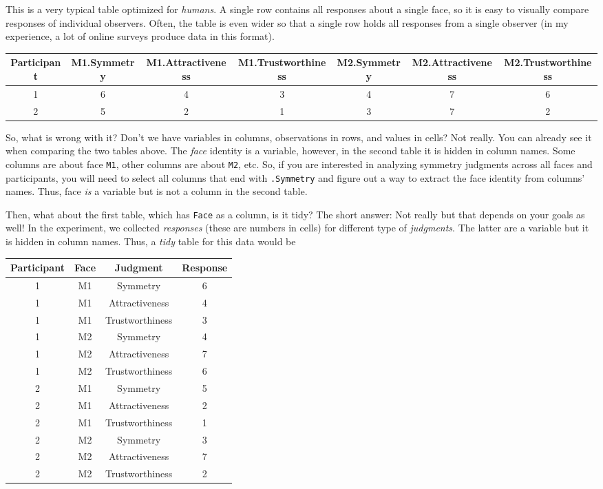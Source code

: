 \documentclass[
]{book}
\begin{document}
This is a very typical table optimized for \emph{humans}. A single row contains all responses about a single face, so it is easy to visually compare responses of individual observers. Often, the table is even wider so that a single row holds all responses from a single observer (in my experience, a lot of online surveys produce data in this format).

\begin{tabular}{c|c|c|c|c|c|c}
\hline
Participant & M1.Symmetry & M1.Attractiveness & M1.Trustworthiness & M2.Symmetry & M2.Attractiveness & M2.Trustworthiness\\
\hline
1 & 6 & 4 & 3 & 4 & 7 & 6\\
\hline
2 & 5 & 2 & 1 & 3 & 7 & 2\\
\hline
\end{tabular}

So, what is wrong with it? Don't we have variables in columns, observations in rows, and values in cells? Not really. You can already see it when comparing the two tables above. The \emph{face} identity is a variable, however, in the second table it is hidden in column names. Some columns are about face \texttt{M1}, other columns are about \texttt{M2}, etc. So, if you are interested in analyzing symmetry judgments across all faces and participants, you will need to select all columns that end with \texttt{.Symmetry} and figure out a way to extract the face identity from columns' names. Thus, face \emph{is} a variable but is not a column in the second table.

Then, what about the first table, which has \texttt{Face} as a column, is it tidy? The short answer: Not really but that depends on your goals as well! In the experiment, we collected \emph{responses} (these are numbers in cells) for different type of \emph{judgments}. The latter are a variable but it is hidden in column names. Thus, a \emph{tidy} table for this data would be

\begin{tabular}{c|c|c|c}
\hline
Participant & Face & Judgment & Response\\
\hline
1 & M1 & Symmetry & 6\\
\hline
1 & M1 & Attractiveness & 4\\
\hline
1 & M1 & Trustworthiness & 3\\
\hline
1 & M2 & Symmetry & 4\\
\hline
1 & M2 & Attractiveness & 7\\
\hline
1 & M2 & Trustworthiness & 6\\
\hline
2 & M1 & Symmetry & 5\\
\hline
2 & M1 & Attractiveness & 2\\
\hline
2 & M1 & Trustworthiness & 1\\
\hline
2 & M2 & Symmetry & 3\\
\hline
2 & M2 & Attractiveness & 7\\
\hline
2 & M2 & Trustworthiness & 2\\
\hline
\end{tabular}
\end{document}
